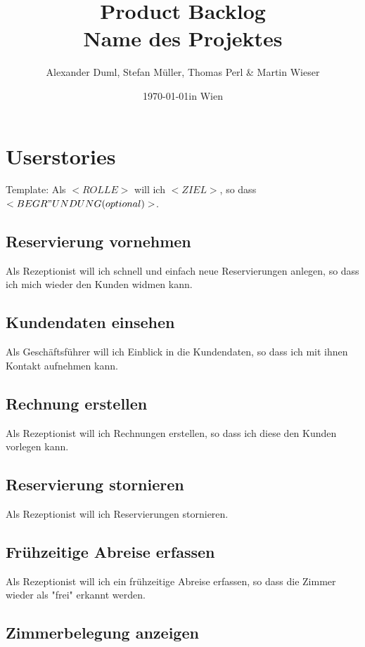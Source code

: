 \documentclass[11pt]{scrartcl}
\title{Product Backlog \\ \large Name des Projektes}
\author{Alexander Duml, Stefan Müller, Thomas Perl \& Martin Wieser}
\date{\today in Wien}
\begin{document}
\maketitle

\section{Userstories}

Template: Als $<ROLLE>$ will ich $<ZIEL>$, so dass $<BEGR"UNDUNG (optional)>$.

\subsection{Reservierung vornehmen}

Als Rezeptionist will ich schnell und einfach neue Reservierungen anlegen, so dass ich mich wieder den Kunden widmen kann.

\subsection{Kundendaten einsehen}

Als Geschäftsführer will ich Einblick in die Kundendaten, so dass ich mit ihnen Kontakt aufnehmen kann.

\subsection{Rechnung erstellen}

Als Rezeptionist will ich Rechnungen erstellen, so dass ich diese den Kunden vorlegen kann.

\subsection{Reservierung stornieren}

Als Rezeptionist will ich Reservierungen stornieren.

\subsection{Frühzeitige Abreise erfassen}

Als Rezeptionist will ich ein frühzeitige Abreise erfassen, so dass die Zimmer wieder als "frei" erkannt werden.

\subsection{Zimmerbelegung anzeigen}
\end{document}
